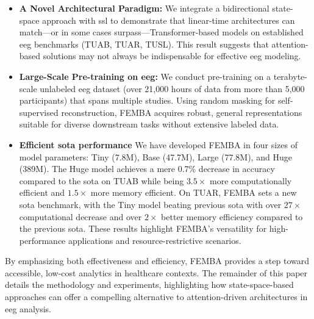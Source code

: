 \begin{itemize}
    \item \textbf{A Novel Architectural Paradigm:} We integrate a bidirectional state-space approach with \gls{ssl} to demonstrate that linear-time architectures can match—or in some cases surpass—Transformer-based models on established \gls{eeg} benchmarks (TUAB, TUAR, TUSL). This result suggests that attention-based solutions may not always be indispensable for effective \gls{eeg} modeling.
    
    \item \textbf{Large-Scale Pre-training on \gls{eeg}:} We conduct pre-training on a terabyte-scale unlabeled \gls{eeg} dataset (over 21,000 hours of data from more than 5,000 participants) that spans multiple studies. Using random masking for self-supervised reconstruction, FEMBA acquires robust, general representations suitable for diverse downstream tasks without extensive labeled data.
    
    \item \textbf {Efficient \gls{sota} performance} We have developed FEMBA in four sizes of model parameters: Tiny (7.8M), Base (47.7M), Large (77.8M), and Huge (389M). The Huge model achieves a mere 0.7\% decrease in accuracy compared to the \gls{sota} on TUAB while being \textbf{$3.5\times$} more computationally efficient and \textbf{$1.5\times$} more memory efficient. On TUAR, FEMBA sets a new \gls{sota} benchmark, with the Tiny model beating previous \gls{sota} with over \textbf{$27\times$} computational decrease and over \textbf{$2\times$} better memory efficiency compared to the previous \gls{sota}. These results highlight FEMBA's versatility for high-performance applications and resource-restrictive scenarios.
\end{itemize}

By emphasizing both effectiveness and efficiency, FEMBA provides a step toward accessible, low-cost analytics in healthcare contexts. The remainder of this paper details the methodology and experiments, highlighting how state-space-based approaches can offer a compelling alternative to attention-driven architectures in \gls{eeg} analysis.

